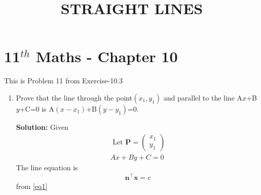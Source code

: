 \documentclass[10pt]{article}
\newcommand{\solution}{\noindent \textbf{Solution: }}
\newcommand{\myvec}[1]{\ensuremath{\begin{pmatrix}#1\end{pmatrix}}}
\let\vec\mathbf{}
\begin{document}
\begin{center}
\title{\textbf{STRAIGHT LINES}}
\date{\vspace{-5ex}} %
\maketitle
\end{center}

\section{11$^{th}$ Maths - Chapter 10}
This is Problem 11 from Exercise-10.3
\begin{enumerate}
\item Prove that the line through the point$(x_1,y_1)$ and parallel to the line A$x$+B$y$+C=0 is A$(x-x_1)$+B$(y-y_1)$=0.

\solution
Given 
\begin{align}
\text{ Let }\vec{P}=\myvec{x_1\\y_1}\\
Ax+By+C=0
\label{eq1}
\end{align}
The line equation is
\begin{align}
\vec{n}^{\top}\vec{x}=c
\end{align}
from \eqref{eq1}


\end{enumerate}
\end{document}
